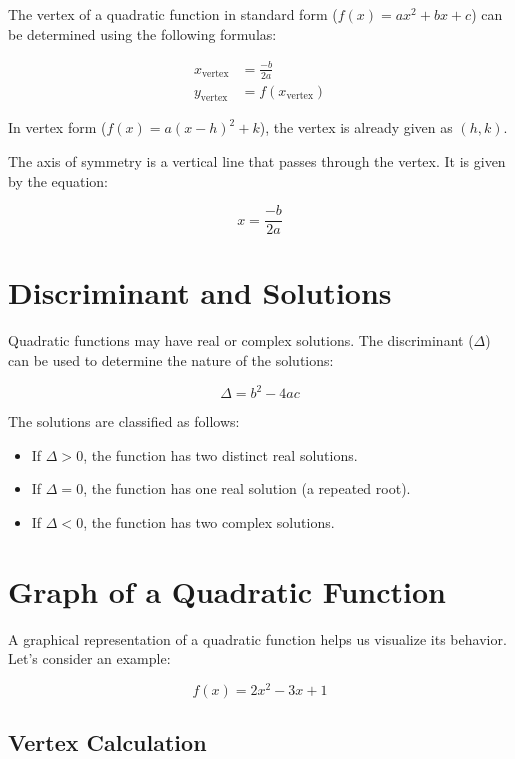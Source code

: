 \documentclass[12pt,a4paper]{article}
\begin{document}
The vertex of a quadratic function in standard form ($f(x) = ax^2 + bx + c$) can be determined using the following formulas:

\begin{align}
x_{\text{vertex}} &= \frac{-b}{2a} \\
y_{\text{vertex}} &= f(x_{\text{vertex}})
\end{align}

In vertex form ($f(x) = a(x - h)^2 + k$), the vertex is already given as $(h, k)$.

The axis of symmetry is a vertical line that passes through the vertex. It is given by the equation:

\begin{equation}
x = \frac{-b}{2a}
\end{equation}

\section{Discriminant and Solutions}

Quadratic functions may have real or complex solutions. The discriminant ($\Delta$) can be used to determine the nature of the solutions:

\begin{equation}
\Delta = b^2 - 4ac
\end{equation}

The solutions are classified as follows:

\begin{itemize}
    \item If $\Delta > 0$, the function has two distinct real solutions.
    \item If $\Delta = 0$, the function has one real solution (a repeated root).
    \item If $\Delta < 0$, the function has two complex solutions.
\end{itemize}
\section{Graph of a Quadratic Function}

A graphical representation of a quadratic function helps us visualize its behavior. Let's consider an example:

\begin{equation}
f(x) = 2x^2 - 3x + 1
\end{equation}

\subsection{Vertex Calculation}
\end{document}
